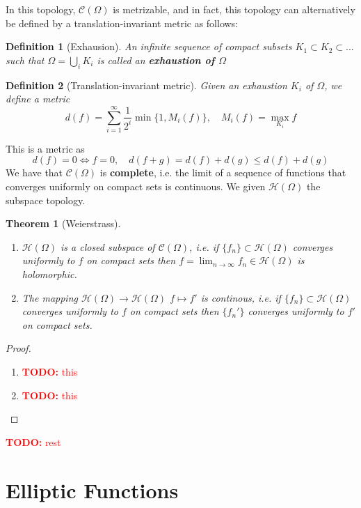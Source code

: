 \documentclass{article}
\newtheorem{theorem}{Theorem}
\newcommand{\mc}[1]{\mathcal{#1}}
\newtheorem{definition}{Definition}
\newcommand{\TODO}[1]{\begin{center}\huge{\textcolor{red}{\textbf{TODO:} #1}}\end{center}}
\begin{document}
In this topology, \(\mc{C}(\Omega)\) is metrizable, and in fact, this topology can alternatively be defined by a translation-invariant metric as follows:
\begin{definition}[Exhausion]
An infinite sequence of compact subsets \(K_1 \subset K_2 \subset ...\) such that \(\Omega = \bigcup_i K_i\) is called an \textbf{exhaustion of \(\Omega\)}
\end{definition}
\begin{definition}[Translation-invariant metric]
Given an exhaustion \(K_i\) of \(\Omega\), we define a metric
\[d(f) = \sum_{i = 1}^\infty\frac{1}{2^i}\min\{1, M_i(f)\}, \quad M_i(f) = \max_{K_i}f\]
\end{definition}
This is a metric as
\[d(f) = 0 \iff f = 0, \quad d(f + g) = d(f) + d(g) \leq d(f) + d(g)\]
We have that \(\mc{C}(\Omega)\) is \textbf{complete}, i.e. the limit of a sequence of functions that converges uniformly on compact sets is continuous. We given \(\mc{H}(\Omega)\) the subspace topology.
\begin{theorem}[Weierstrass]
\begin{enumerate}
  \item \(\mc{H}(\Omega)\) is a closed subspace of \(\mc{C}(\Omega)\), i.e. if \(\{f_n\} \subset \mc{H}(\Omega)\) converges uniformly to \(f\) on compact sets then \(f = \lim_{n \to \infty}f_n \in \mc{H}(\Omega)\) is holomorphic.
  \item The mapping \(\mc{H}(\Omega) \to \mc{H}(\Omega)\) \(f \mapsto f'\) is continous, i.e. if \(\{f_n\} \subset \mc{H}(\Omega)\) converges uniformly to \(f\) on compact sets then \(\{f_n'\}\) converges uniformly to \(f'\) on compact sets.
\end{enumerate}
\end{theorem}
\begin{proof}
\begin{enumerate}

  \item \TODO{this}

  \item \TODO{this}

\end{enumerate}
\end{proof}

\TODO{rest}

\section{Elliptic Functions}
\end{document}
